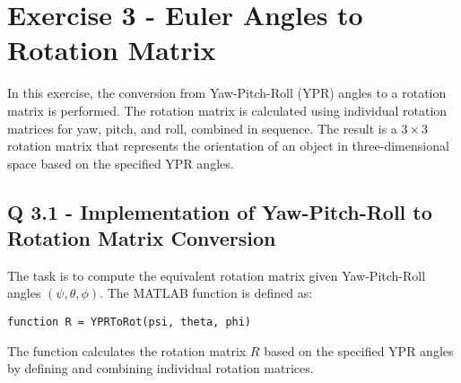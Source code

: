 \section{Exercise 3 - Euler Angles to Rotation Matrix} \label{P3}

In this exercise, the conversion from Yaw-Pitch-Roll (YPR) angles to a rotation matrix is performed. The rotation matrix is calculated using individual rotation matrices for yaw, pitch, and roll, combined in sequence. The result is a \(3 \times 3\) rotation matrix that represents the orientation of an object in three-dimensional space based on the specified YPR angles.

\subsection{Q 3.1 - Implementation of Yaw-Pitch-Roll to Rotation Matrix Conversion}

The task is to compute the equivalent rotation matrix given Yaw-Pitch-Roll angles \((\psi, \theta, \phi)\). The MATLAB function is defined as:

\begin{verbatim}
function R = YPRToRot(psi, theta, phi)
\end{verbatim}

The function calculates the rotation matrix \( R \) based on the specified YPR angles by defining and combining individual rotation matrices.

